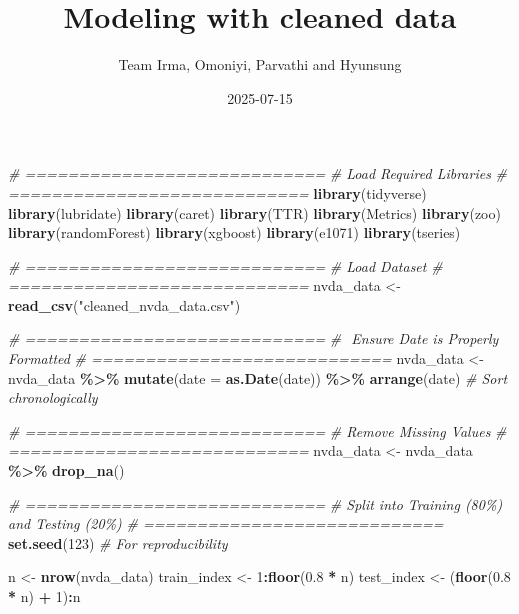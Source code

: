 \documentclass[
]{article}
\title{Modeling with cleaned data}
\author{Team Irma, Omoniyi, Parvathi and Hyunsung}
\date{2025-07-15}
\newenvironment{Shaded}{\begin{snugshade}}{\end{snugshade}}
\newcommand{\AttributeTok}[1]{\textcolor[rgb]{0.13,0.29,0.53}{#1}}
\newcommand{\CommentTok}[1]{\textcolor[rgb]{0.56,0.35,0.01}{\textit{#1}}}
\newcommand{\DecValTok}[1]{\textcolor[rgb]{0.00,0.00,0.81}{#1}}
\newcommand{\FloatTok}[1]{\textcolor[rgb]{0.00,0.00,0.81}{#1}}
\newcommand{\FunctionTok}[1]{\textcolor[rgb]{0.13,0.29,0.53}{\textbf{#1}}}
\newcommand{\NormalTok}[1]{#1}
\newcommand{\OtherTok}[1]{\textcolor[rgb]{0.56,0.35,0.01}{#1}}
\newcommand{\SpecialCharTok}[1]{\textcolor[rgb]{0.81,0.36,0.00}{\textbf{#1}}}
\newcommand{\StringTok}[1]{\textcolor[rgb]{0.31,0.60,0.02}{#1}}
\begin{document}
\maketitle

\begin{Shaded}
\begin{Highlighting}[]
\CommentTok{\# ============================}
\CommentTok{\#  Load Required Libraries}
\CommentTok{\# ============================}
\FunctionTok{library}\NormalTok{(tidyverse)}
\FunctionTok{library}\NormalTok{(lubridate)}
\FunctionTok{library}\NormalTok{(caret)}
\FunctionTok{library}\NormalTok{(TTR)}
\FunctionTok{library}\NormalTok{(Metrics)}
\FunctionTok{library}\NormalTok{(zoo)}
\FunctionTok{library}\NormalTok{(randomForest)}
\FunctionTok{library}\NormalTok{(xgboost)}
\FunctionTok{library}\NormalTok{(e1071)}
\FunctionTok{library}\NormalTok{(tseries)}

\CommentTok{\# ============================}
\CommentTok{\# Load Dataset}
\CommentTok{\# ============================}
\NormalTok{nvda\_data }\OtherTok{\textless{}{-}} \FunctionTok{read\_csv}\NormalTok{(}\StringTok{"cleaned\_nvda\_data.csv"}\NormalTok{)}

\CommentTok{\# ============================}
\CommentTok{\# ️ Ensure Date is Properly Formatted}
\CommentTok{\# ============================}
\NormalTok{nvda\_data }\OtherTok{\textless{}{-}}\NormalTok{ nvda\_data }\SpecialCharTok{\%\textgreater{}\%}
  \FunctionTok{mutate}\NormalTok{(}\AttributeTok{date =} \FunctionTok{as.Date}\NormalTok{(date)) }\SpecialCharTok{\%\textgreater{}\%}
  \FunctionTok{arrange}\NormalTok{(date)  }\CommentTok{\# Sort chronologically}

\CommentTok{\# ============================}
\CommentTok{\#  Remove Missing Values}
\CommentTok{\# ============================}
\NormalTok{nvda\_data }\OtherTok{\textless{}{-}}\NormalTok{ nvda\_data }\SpecialCharTok{\%\textgreater{}\%} \FunctionTok{drop\_na}\NormalTok{()}

\CommentTok{\# ============================}
\CommentTok{\#  Split into Training (80\%) and Testing (20\%)}
\CommentTok{\# ============================}
\FunctionTok{set.seed}\NormalTok{(}\DecValTok{123}\NormalTok{)  }\CommentTok{\# For reproducibility}

\NormalTok{n }\OtherTok{\textless{}{-}} \FunctionTok{nrow}\NormalTok{(nvda\_data)}
\NormalTok{train\_index }\OtherTok{\textless{}{-}} \DecValTok{1}\SpecialCharTok{:}\FunctionTok{floor}\NormalTok{(}\FloatTok{0.8} \SpecialCharTok{*}\NormalTok{ n)}
\NormalTok{test\_index }\OtherTok{\textless{}{-}}\NormalTok{ (}\FunctionTok{floor}\NormalTok{(}\FloatTok{0.8} \SpecialCharTok{*}\NormalTok{ n) }\SpecialCharTok{+} \DecValTok{1}\NormalTok{)}\SpecialCharTok{:}\NormalTok{n}


\end{Highlighting}
\end{Shaded}
\end{document}
